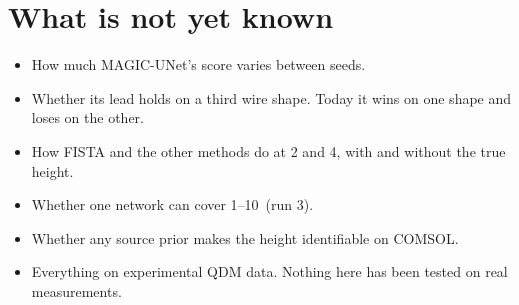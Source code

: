 \section{What is not yet known}

\begin{itemize}
\item How much MAGIC-UNet's score varies between seeds.
\item Whether its lead holds on a third wire shape. Today it wins on one shape and loses on the other.
\item How FISTA and the other methods do at 2 and 4\um, with and without the true height.
\item Whether one network can cover 1--10\um\ (run 3).
\item Whether any source prior makes the height identifiable on COMSOL.
\item Everything on experimental QDM data. Nothing here has been tested on real measurements.
\end{itemize}
